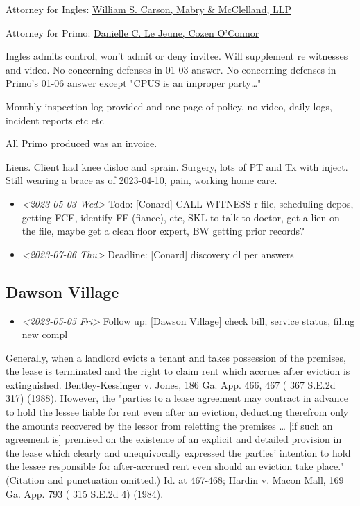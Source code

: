\documentclass[11pt]{article}
\begin{document}
Attorney for Ingles: \href{https://www.gabar.org/MemberSearchDetail.cfm?ID=MjQzNzkw}{William S. Carson, Mabry \& McClelland, LLP}

Attorney for Primo: \href{https://www.gabar.org/MemberSearchDetail.cfm?ID=MTM0MjIy}{Danielle C. Le Jeune, Cozen O'Connor}

Ingles admits control, won't admit or deny invitee. Will supplement re witnesses and video. No concerning defenses in 01-03 answer. No concerning defenses in Primo's 01-06 answer except "CPUS is an improper party\ldots{}"

Monthly inspection log provided and one page of policy, no video, daily logs, incident reports etc etc

All Primo produced was an invoice.

Liens. Client had knee disloc and sprain. Surgery, lots of PT and Tx with inject. Still wearing a brace as of 2023-04-10, pain, working home care.

\begin{itemize}
\item \textit{<2023-05-03 Wed> } Todo: [Conard] CALL WITNESS r file, scheduling depos, getting FCE, identify FF (fiance), etc, SKL to talk to doctor, get a lien on the file, maybe get a clean floor expert, BW getting prior records?

\item \textit{<2023-07-06 Thu> } Deadline: [Conard] discovery dl per answers
\end{itemize}

\subsection*{Dawson Village}
\label{sec:org03fcc7d}

\begin{itemize}
\item \textit{<2023-05-05 Fri> } Follow up: [Dawson Village] check bill, service status, filing new compl
\end{itemize}

Generally, when a landlord evicts a tenant and takes possession of the premises, the lease is terminated and the right to claim rent which accrues after eviction is extinguished. Bentley-Kessinger v. Jones, 186 Ga. App. 466, 467 ( 367 S.E.2d 317) (1988). However, the "parties to a lease agreement may contract in advance to hold the lessee liable for rent even after an eviction, deducting therefrom only the amounts recovered by the lessor from reletting the premises \ldots{} [if such an agreement is] premised on the existence of an explicit and detailed provision in the lease which clearly and unequivocally expressed the parties' intention to hold the lessee responsible for after-accrued rent even should an eviction take place." (Citation and punctuation omitted.) Id. at 467-468; Hardin v. Macon Mall, 169 Ga. App. 793 ( 315 S.E.2d 4) (1984).
\end{document}
